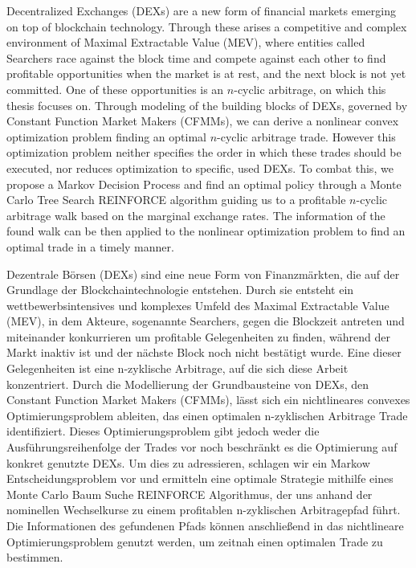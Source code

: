 Decentralized Exchanges (DEXs) are a new form of financial markets emerging
on top of blockchain technology. Through these arises a competitive and
complex environment of Maximal Extractable Value (MEV), where entities called
Searchers race against the block time and compete against each other to find
profitable opportunities when the market is at rest, and the next block is
not yet committed. One of these opportunities is an $n$-cyclic arbitrage, on
which this thesis focuses on. Through modeling of the building blocks of
DEXs, governed by Constant Function Market Makers (CFMMs), we can derive a
nonlinear convex optimization problem finding an optimal $n$-cyclic arbitrage
trade. However this optimization problem neither specifies the order in which
these trades should be executed, nor reduces optimization to specific, used
DEXs. To combat this, we propose a Markov Decision Process and find an
optimal policy through a Monte Carlo Tree Search REINFORCE algorithm guiding
us to a profitable $n$-cyclic arbitrage walk based on the marginal exchange
rates. The information of the found walk can be then applied to the nonlinear
optimization problem to find an optimal trade in a timely manner.

Dezentrale Börsen (DEXs) sind eine neue Form von Finanzmärkten, die auf der
Grundlage der Blockchaintechnologie entstehen. Durch sie entsteht ein
wettbewerbsintensives und komplexes Umfeld des Maximal Extractable Value
(MEV), in dem Akteure, sogenannte Searchers, gegen die Blockzeit antreten und
miteinander konkurrieren um profitable Gelegenheiten zu finden, während der
Markt inaktiv ist und der nächste Block noch nicht bestätigt wurde. Eine
dieser Gelegenheiten ist eine n-zyklische Arbitrage, auf die sich diese
Arbeit konzentriert. Durch die Modellierung der Grundbausteine von DEXs,
den Constant Function Market Makers (CFMMs), lässt sich ein nichtlineares
convexes Optimierungsproblem ableiten, das einen optimalen n-zyklischen
Arbitrage Trade identifiziert. Dieses Optimierungsproblem gibt jedoch weder
die Ausführungsreihenfolge der Trades vor noch beschränkt es die
Optimierung auf konkret genutzte DEXs. Um dies zu adressieren, schlagen wir
ein Markow Entscheidungsproblem vor und ermitteln eine optimale Strategie
mithilfe eines Monte Carlo Baum Suche REINFORCE Algorithmus, der uns anhand
der nominellen Wechselkurse zu einem profitablen n-zyklischen Arbitragepfad
führt. Die Informationen des gefundenen Pfads können anschließend in das
nichtlineare Optimierungsproblem genutzt werden, um zeitnah einen optimalen
Trade zu bestimmen.

